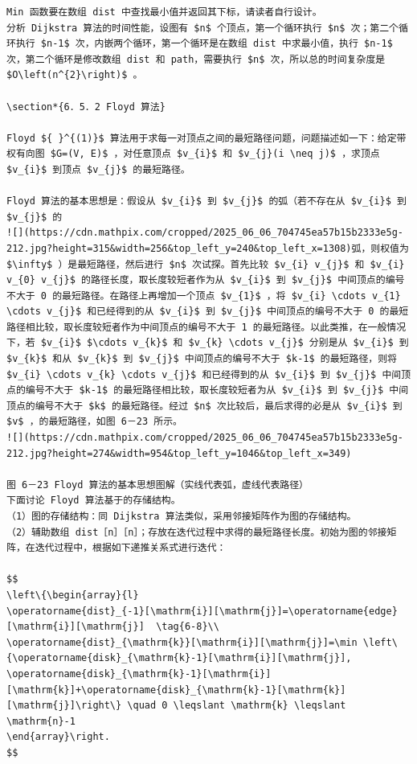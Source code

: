 \documentclass[10pt]{article}
\begin{document}
\begin{verbatim}
Min 函数要在数组 dist 中查找最小值并返回其下标，请读者自行设计。
分析 Dijkstra 算法的时间性能，设图有 $n$ 个顶点，第一个循环执行 $n$ 次；第二个循环执行 $n-1$ 次，内嵌两个循环，第一个循环是在数组 dist 中求最小值，执行 $n-1$ 次，第二个循环是修改数组 dist 和 path，需要执行 $n$ 次，所以总的时间复杂度是 $O\left(n^{2}\right)$ 。

\section*{6．5．2 Floyd 算法}

Floyd ${ }^{(1)}$ 算法用于求每一对顶点之间的最短路径问题，问题描述如一下：给定带权有向图 $G=(V, E)$ ，对任意顶点 $v_{i}$ 和 $v_{j}(i \neq j)$ ，求顶点 $v_{i}$ 到顶点 $v_{j}$ 的最短路径。

Floyd 算法的基本思想是：假设从 $v_{i}$ 到 $v_{j}$ 的弧（若不存在从 $v_{i}$ 到 $v_{j}$ 的
![](https://cdn.mathpix.com/cropped/2025_06_06_704745ea57b15b2333e5g-212.jpg?height=315&width=256&top_left_y=240&top_left_x=1308)弧，则权值为 $\infty$ ）是最短路径，然后进行 $n$ 次试探。首先比较 $v_{i} v_{j}$ 和 $v_{i} v_{0} v_{j}$ 的路径长度，取长度较短者作为从 $v_{i}$ 到 $v_{j}$ 中间顶点的编号不大于 0 的最短路径。在路径上再增加一个顶点 $v_{1}$ ，将 $v_{i} \cdots v_{1} \cdots v_{j}$ 和已经得到的从 $v_{i}$ 到 $v_{j}$ 中间顶点的编号不大于 0 的最短路径相比较，取长度较短者作为中间顶点的编号不大于 1 的最短路径。以此类推，在一般情况下，若 $v_{i}$ $\cdots v_{k}$ 和 $v_{k} \cdots v_{j}$ 分别是从 $v_{i}$ 到 $v_{k}$ 和从 $v_{k}$ 到 $v_{j}$ 中间顶点的编号不大于 $k-1$ 的最短路径，则将 $v_{i} \cdots v_{k} \cdots v_{j}$ 和已经得到的从 $v_{i}$ 到 $v_{j}$ 中间顶点的编号不大于 $k-1$ 的最短路径相比较，取长度较短者为从 $v_{i}$ 到 $v_{j}$ 中间顶点的编号不大于 $k$ 的最短路径。经过 $n$ 次比较后，最后求得的必是从 $v_{i}$ 到 $v$ ，的最短路径，如图 6－23 所示。
![](https://cdn.mathpix.com/cropped/2025_06_06_704745ea57b15b2333e5g-212.jpg?height=274&width=954&top_left_y=1046&top_left_x=349)

图 6－23 Floyd 算法的基本思想图解（实线代表弧，虚线代表路径）
下面讨论 Floyd 算法基于的存储结构。
（1）图的存储结构：同 Dijkstra 算法类似，采用邻接矩阵作为图的存储结构。
（2）辅助数组 dist［n］［n］；存放在迭代过程中求得的最短路径长度。初始为图的邻接矩阵，在迭代过程中，根据如下递推关系式进行迭代：

$$
\left\{\begin{array}{l}
\operatorname{dist}_{-1}[\mathrm{i}][\mathrm{j}]=\operatorname{edge}[\mathrm{i}][\mathrm{j}]  \tag{6-8}\\
\operatorname{dist}_{\mathrm{k}}[\mathrm{i}][\mathrm{j}]=\min \left\{\operatorname{disk}_{\mathrm{k}-1}[\mathrm{i}][\mathrm{j}], \operatorname{disk}_{\mathrm{k}-1}[\mathrm{i}][\mathrm{k}]+\operatorname{disk}_{\mathrm{k}-1}[\mathrm{k}][\mathrm{j}]\right\} \quad 0 \leqslant \mathrm{k} \leqslant \mathrm{n}-1
\end{array}\right.
$$



\end{verbatim}
\end{document}
